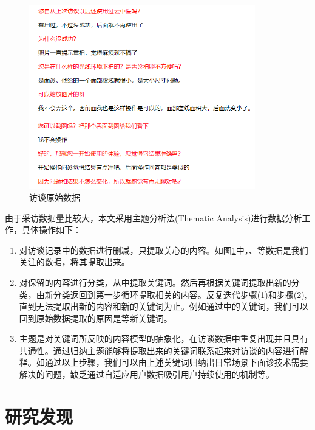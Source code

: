 \begin{figure}[h]
    \centering
    \includegraphics[height=8cm]{images/datas.png}
    \caption{访谈原始数据}
    \label{fig:datas}
\end{figure}

由于采访数据量比较大，本文采用主题分析法(Thematic Analysis)进行数据分析工作，具体操作如下\cite{SchwandtQualitative}：



\begin{enumerate}

    \item 对访谈记录中的数据进行删减，只提取关心的内容。如图\ref{fig:datas}中，、等数据是我们关注的数据，将其提取出来。

    \item 对保留的内容进行分类，从中提取关键词。然后再根据关键词提取出新的分类，由新分类返回到第一步循环提取相关的内容。反复迭代步骤(1)和步骤(2), 直到无法提取出新的内容和新的关键词为止。例如通过中的关键词，我们可以回到原始数据提取的原因是等新关键词。

    \item 主题是对关键词所反映的内容模型的抽象化，在访谈数据中重复出现并且具有共通性。通过归纳主题能够将提取出来的关键词联系起来对访谈的内容进行解释。如通过以上步骤，我们可以由上述关键词归纳出日常场景下面诊技术需要解决的问题，缺乏通过自适应用户数据吸引用户持续使用的机制等。
\end{enumerate}

\section{研究发现}

